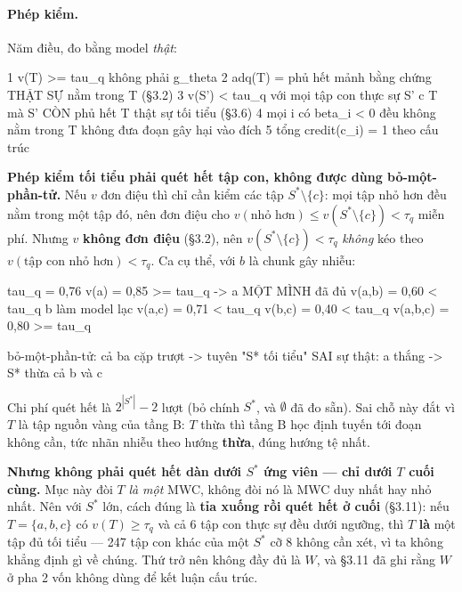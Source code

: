 \documentclass[11pt,a4paper]{article}
\begin{document}
\paragraph{Phép kiểm.} Năm điều, đo bằng model \emph{thật}:

\begin{dia}
1  v(T) >= tau_q                                 không phải g_theta
2  adq(T) = phủ hết mảnh                         bằng chứng THẬT SỰ nằm trong T (§3.2)
3  v(S') < tau_q  với mọi tập con thực sự S' c T
   mà S' CÒN phủ hết                             T thật sự tối tiểu (§3.6)
4  mọi i có beta_i < 0 đều không nằm trong T      không đưa đoạn gây hại vào đích
5  tổng credit(c_i) = 1                           theo cấu trúc
\end{dia}

\textbf{Phép kiểm tối tiểu phải quét hết tập con, không được dùng bỏ-một-phần-tử.} Nếu $v$
đơn điệu thì chỉ cần kiểm các tập $S^*\setminus\{c\}$: mọi tập nhỏ hơn đều nằm trong một tập
đó, nên đơn điệu cho $v(\text{nhỏ hơn})\le v(S^*\setminus\{c\})<\tau_q$ miễn phí. Nhưng $v$
\textbf{không đơn điệu} (\S3.2), nên $v(S^*\setminus\{c\})<\tau_q$ \emph{không} kéo theo
$v(\text{tập con nhỏ hơn})<\tau_q$. Ca cụ thể, với $b$ là chunk gây nhiễu:

\begin{dia}
tau_q = 0,76
v({a})     = 0,85  >= tau_q     ->  {a} MỘT MÌNH đã đủ
v({a,b})   = 0,60  <  tau_q         b làm model lạc
v({a,c})   = 0,71  <  tau_q
v({b,c})   = 0,40  <  tau_q
v({a,b,c}) = 0,80  >= tau_q

bỏ-một-phần-tử:  cả ba cặp trượt  ->  tuyên "S* tối tiểu"      SAI
sự thật:         {a} thắng        ->  S* thừa cả b và c
\end{dia}

Chi phí quét hết là $2^{|S^*|}-2$ lượt (bỏ chính $S^*$, và $\emptyset$ đã đo sẵn). Sai chỗ
này đắt vì $T$ là tập nguồn vàng của tầng B: $T$ thừa thì tầng B học định tuyến tới đoạn không
cần, tức nhãn nhiễu theo hướng \textbf{thừa}, đúng hướng tệ nhất.

\textbf{Nhưng không phải quét hết dàn dưới $S^*$ ứng viên --- chỉ dưới $T$ cuối cùng.} Mục này
đòi $T$ \emph{là một} MWC, không đòi nó là MWC duy nhất hay nhỏ nhất. Nên với $S^*$ lớn, cách
đúng là \textbf{tỉa xuống rồi quét hết ở cuối} (\S3.11): nếu $T=\{a,b,c\}$ có $v(T)\ge\tau_q$
và cả 6 tập con thực sự đều dưới ngưỡng, thì $T$ \textbf{là} một tập đủ tối tiểu --- 247 tập
con khác của một $S^*$ cỡ 8 không cần xét, vì ta không khẳng định gì về chúng. Thứ trở nên
không đầy đủ là $W$, và \S3.11 đã ghi rằng $W$ ở pha 2 vốn không dùng để kết luận cấu trúc.
\end{document}

